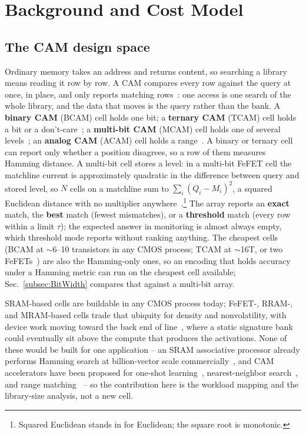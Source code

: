 \documentclass[conference]{IEEEtran}
\newcommand{\cam}{{CAM}\xspace}
\newcommand{\tcam}{{TCAM}\xspace}
\newcommand{\mcam}{{MCAM}\xspace}
\newcommand{\acam}{{ACAM}\xspace}
\newcommand{\fefet}{{FeFET}\xspace}
\newcommand{\fefets}{{FeFETs}\xspace}
\begin{document}
\section{Background and Cost Model}
\label{sec:Background}

\subsection{The CAM design space}
\label{subsec:CAMspace}
\label{subsec:CAMtech}
Ordinary memory takes an address and returns content, so searching a
library means reading it row by row. A \cam compares every row
against the query at once, in place, and only reports matching
rows~\cite{pagiamtzis2006cam}: one access is one search of the whole
library, and the data that moves is the query rather than the bank.
A \textbf{binary \cam} (BCAM) cell holds one bit; a \textbf{ternary
\cam} (\tcam) cell holds a bit or a don't-care~\cite{ni2019fetcam}; a
\textbf{multi-bit \cam} (\mcam) cell holds one of several
levels~\cite{kazemi2021fefetcam}; an \textbf{analog \cam} (\acam)
cell holds a range~\cite{li2020acam}. A binary or ternary cell can
report only whether a position disagrees, so a row of them measures
Hamming distance. A multi-bit cell stores a level: in a multi-bit
\fefet cell the matchline current is approximately quadratic in the
difference between query and stored level, so $N$ cells on a
matchline sum to $\sum_i (Q_i-M_i)^2$, a squared Euclidean distance
with no multiplier
anywhere~\cite{kazemi2021fefetcam,kazemi2022hdcfefet}.\footnote{Squared
Euclidean stands in for Euclidean; the square root is monotonic.} The
array reports an \textbf{exact}
match, the \textbf{best} match (fewest mismatches), or a
\textbf{threshold} match (every row within a limit $\tau$); the
expected answer in monitoring is almost always empty, which threshold
mode reports without ranking anything. The cheapest cells (BCAM at
$\sim$6--10 transistors in any CMOS process; \tcam at $\sim$16T, or
two \fefets~\cite{pagiamtzis2006cam,ni2019fetcam}) are also the
Hamming-only ones, so an encoding that holds accuracy under a Hamming
metric can run on the cheapest cell available;
Sec.~\ref{subsec:BitWidth} compares that against a multi-bit array.

SRAM-based cells are buildable in any CMOS process today; \fefet-,
RRAM-, and MRAM-based cells trade that ubiquity for density and
nonvolatility, with device work moving toward the back end of
line~\cite{dutta2020m3dfefet}, where a static signature bank could
eventually sit above the compute that produces the activations. None
of these would be built for one application -- an SRAM associative
processor already performs Hamming search at billion-vector scale
commercially~\cite{gsi2025apu}, and \cam accelerators have been
proposed for one-shot learning~\cite{ni2019fetcam}, nearest-neighbor
search~\cite{kazemi2021fefetcam}, and range
matching~\cite{li2020acam} -- so the contribution here is the
workload mapping and the library-size analysis, not a new cell.
\end{document}
